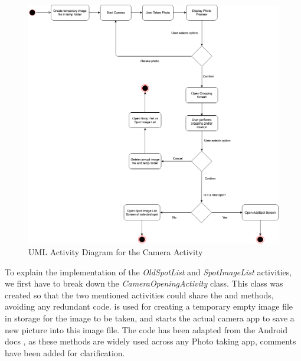 \begin{figure}
    \includegraphics[width=1.2\textwidth, center]{figures/CameraScreen.png}
    \caption{UML Activity Diagram for the Camera Activity}
    \label{fig:CameraScreen}
\end{figure}
To explain the implementation of the \emph{OldSpotList} and \emph{SpotImageList} activities, we first have to break down the \emph{CameraOpeningActivity} class. This class was created so that the two mentioned activities could share the  and  methods, avoiding any redundant code.  is used for creating a temporary empty image file in storage for the image to be taken, and  starts the actual camera app to save a new picture into this image file. The code has been adapted from the Android docs \cite{androiddevelopers3}, as these methods are widely used across any Photo taking app, comments have been added for clarification.

